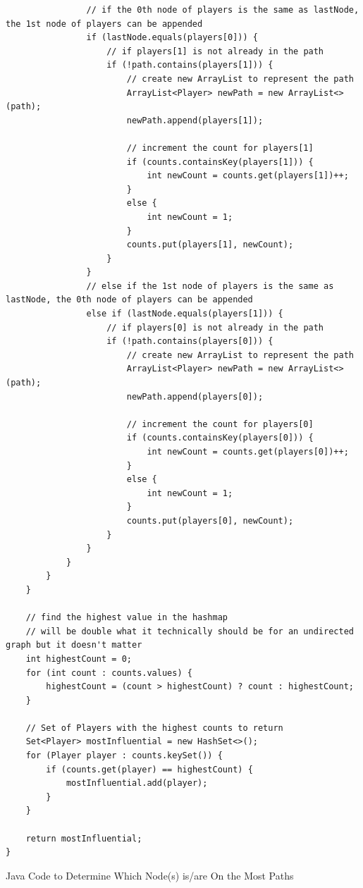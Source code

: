 \documentclass[a4paper,11pt]{article}
\newenvironment{code}{\captionsetup{type=listing}}{}
\begin{document}
\begin{code}
\begin{verbatim}
                // if the 0th node of players is the same as lastNode, the 1st node of players can be appended
                if (lastNode.equals(players[0])) {
                    // if players[1] is not already in the path
                    if (!path.contains(players[1])) {
                        // create new ArrayList to represent the path
                        ArrayList<Player> newPath = new ArrayList<>(path);
                        newPath.append(players[1]);

                        // increment the count for players[1]
                        if (counts.containsKey(players[1])) {
                            int newCount = counts.get(players[1])++;
                        }
                        else {
                            int newCount = 1;
                        }
                        counts.put(players[1], newCount);
                    }
                }
                // else if the 1st node of players is the same as lastNode, the 0th node of players can be appended
                else if (lastNode.equals(players[1])) {
                    // if players[0] is not already in the path
                    if (!path.contains(players[0])) {
                        // create new ArrayList to represent the path
                        ArrayList<Player> newPath = new ArrayList<>(path);
                        newPath.append(players[0]);

                        // increment the count for players[0]
                        if (counts.containsKey(players[0])) {
                            int newCount = counts.get(players[0])++;
                        }
                        else {
                            int newCount = 1;
                        }
                        counts.put(players[0], newCount);
                    }
                }
            }
        }
    }

    // find the highest value in the hashmap
    // will be double what it technically should be for an undirected graph but it doesn't matter
    int highestCount = 0;
    for (int count : counts.values) {
        highestCount = (count > highestCount) ? count : highestCount;
    }

    // Set of Players with the highest counts to return
    Set<Player> mostInfluential = new HashSet<>();
    for (Player player : counts.keySet()) {
        if (counts.get(player) == highestCount) {
            mostInfluential.add(player);
        }
    }

    return mostInfluential;
}
\end{verbatim}
\caption{Java Code to Determine Which Node(s) is/are On the Most Paths}
\end{code}
\end{document}
